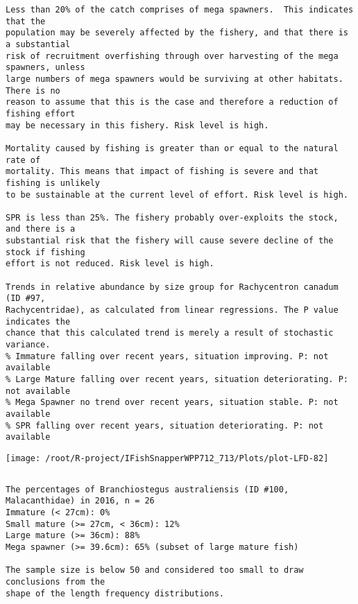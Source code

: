 \documentclass{report}\usepackage[]{graphicx}\usepackage[]{color}
\makeatletter
\def\maxwidth{ %
  \ifdim\Gin@nat@width>\linewidth
    \linewidth
  \else
    \Gin@nat@width
  \fi
}
\newenvironment{kframe}{%
 \def\at@end@of@kframe{}%
 \ifinner\ifhmode%
  \def\at@end@of@kframe{\end{minipage}}%
  \begin{minipage}{\columnwidth}%
 \fi\fi%
 \def\FrameCommand##1{\hskip\@totalleftmargin \hskip-\fboxsep
 \colorbox{shadecolor}{##1}\hskip-\fboxsep
     \hskip-\linewidth \hskip-\@totalleftmargin \hskip\columnwidth}%
 \MakeFramed {\advance\hsize-\width
   \@totalleftmargin\z@ \linewidth\hsize
   \@setminipage}}%
 {\par\unskip\endMakeFramed%
 \at@end@of@kframe}
\newenvironment{knitrout}{}{} %
\makeatother
\begin{document}
\begin{knitrout}
\begin{kframe}
\begin{verbatim}
Less than 20% of the catch comprises of mega spawners.  This indicates that the
population may be severely affected by the fishery, and that there is a substantial
risk of recruitment overfishing through over harvesting of the mega spawners, unless
large numbers of mega spawners would be surviving at other habitats. There is no
reason to assume that this is the case and therefore a reduction of fishing effort
may be necessary in this fishery. Risk level is high.
 
Mortality caused by fishing is greater than or equal to the natural rate of
mortality. This means that impact of fishing is severe and that fishing is unlikely
to be sustainable at the current level of effort. Risk level is high.
 
SPR is less than 25%. The fishery probably over-exploits the stock, and there is a
substantial risk that the fishery will cause severe decline of the stock if fishing
effort is not reduced. Risk level is high.
 
Trends in relative abundance by size group for Rachycentron canadum (ID #97,
Rachycentridae), as calculated from linear regressions. The P value indicates the
chance that this calculated trend is merely a result of stochastic variance.
% Immature falling over recent years, situation improving. P: not available
% Large Mature falling over recent years, situation deteriorating. P: not available
% Mega Spawner no trend over recent years, situation stable. P: not available
% SPR falling over recent years, situation deteriorating. P: not available
\end{verbatim}
\end{kframe}
\texttt{[image: /root/R-project/IFishSnapperWPP712\_713/Plots/plot-LFD-82]} 
\begin{kframe}\begin{verbatim}
\end{verbatim}
\end{kframe}
\clearpage
\newpage
\begin{kframe}\begin{verbatim}
The percentages of Branchiostegus australiensis (ID #100, Malacanthidae) in 2016, n = 26
Immature (< 27cm): 0%
Small mature (>= 27cm, < 36cm): 12%
Large mature (>= 36cm): 88%
Mega spawner (>= 39.6cm): 65% (subset of large mature fish)
 
The sample size is below 50 and considered too small to draw conclusions from the
shape of the length frequency distributions.
\end{verbatim}
\end{kframe}
\newpage
\begin{kframe}\begin{verbatim}
\end{verbatim}
\end{kframe}
\end{knitrout}
\end{document}
